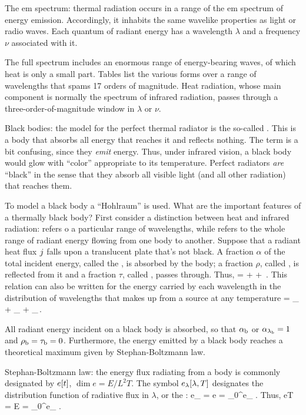 The em spectrum: thermal radiation occurs in a range of the em spectrum of energy emission. Accordingly, it inhabits the same wavelike properties as light or radio waves. Each quantum of radiant energy has a wavelength $\lambda$ and a frequency $\nu$ associated with it. 

The full spectrum includes an enormous range of energy-bearing waves, of which heat is only a small part. Tables list the various forms over a range of wavelengths that spams 17 orders of magnitude. Heat radiation, whose main component is normally the spectrum of infrared radiation, passes through a three-order-of-magnitude window in $\lambda$ or $\nu$.

Black bodies: the model for the perfect thermal radiator is the so-called . This is a body that absorbs all energy that reaches it and reflects nothing. The term is a bit confusing, since they \emph{emit} energy. Thus, under infrared vision, a black body would glow with ``color'' appropriate to its temperature. Perfect radiators \emph{are} ``black'' in the sense that they absorb all visible light (and all other radiation) that reaches them.

To model a black body a ``Hohlraum'' is used. What are the important features of a thermally black body? First consider a distinction between heat and infrared radiation:  refers o a particular range of wavelengths, while  refers to the whole range of radiant energy flowing from one body to another. Suppose that a radiant heat flux $j$ falls upon a translucent plate that's not black. A fraction $\alpha$ of the total incident energy, called the , is absorbed by the body; a fraction $\rho$, called , is reflected from it and a fraction $\tau$, called , passes through. Thus,
 = \alpha + \rho + \tau\,.
\eeq
This relation can also be written for the energy carried by each wavelength in the distribution of wavelengths that makes up  from a source at any temperature
 = \alpha_{\lambda} + \rho_{\lambda} + \tau_{\lambda}\,.
\eeq

All radiant energy incident on a black body is absorbed, so that $\alpha_\text{b}$ or $\alpha_{\lambda_\text{b}} = 1$ and $\rho_\text{b} = \tau_\text{b} = 0$. Furthermore, the energy emitted by a black body reaches a theoretical maximum given by Stephan-Boltzmann law.

Stephan-Boltzmann law: the energy flux radiating from a body is commonly designated by $e\!\left[{t}\right]$, $\dim e = E/L^2T$. The symbol $e_\lambda\!\left[{\lambda, T}\right]$ designates the distribution function of radiative flux in $\lambda$, or the :
\beq
e_\lambda{} = \qquad{}\qquad
e = \int_{0}^{\lambda}e_\lambda{}\,\dx\lambda\,.
\eeq
Thus,
\beq
e\vat T = E = \int_{0}^{\infty}e_\lambda{}\,\dx\lambda\,.
\eeq

